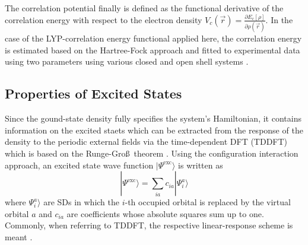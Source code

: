The correlation potential finally is defined as the functional derivative of the correlation energy with respect to the electron density $V_c(\vec{r})=\frac{\partial E_c[\rho]}{\partial\rho(\vec{r})}$.
In the case of the LYP-correlation energy functional applied here, the correlation energy is estimated based on the Hartree-Fock approach and fitted to experimental data using two parameters using various closed and open shell systems \cite{lyp}.

\subsection{Properties of Excited States}
\label{ch:tddft}
Since the gound-state density fully specifies the system's Hamiltonian, it contains information on the excited staets which can be extracted from the response of the density to the periodic external fields via the time-dependent DFT (TDDFT) which is based on the Runge-Gro\ss\, theorem \cite{RungeGross}.
Using the configuration interaction approach, an excited state wave function $|\Psi^\text{exc}\rangle$ is written as
\begin{equation} \label{eq:excCI}
|\Psi^\text{exc}\rangle=\sum_{ia} c_{ia} |\Psi_i^a\rangle
\end{equation}
where $\Psi_i^a\rangle$ are SDs in which the $i$-th occupied orbital is replaced by the virtual orbital $a$ and $c_{ia}$ are coefficients whose absolute squares sum up to one.
Commonly, when referring to TDDFT, the respective linear-response scheme is meant \cite{dreuw}.

